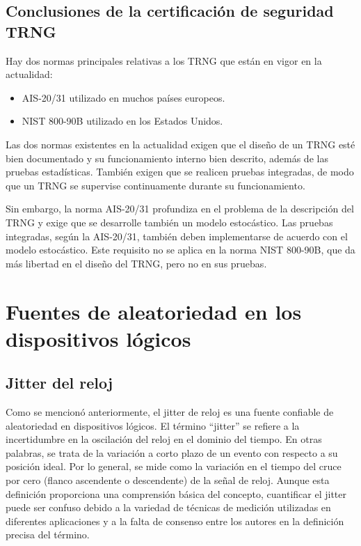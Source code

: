 		\subsection{Conclusiones de la certificación de seguridad TRNG}
		
            Hay dos normas principales relativas a los TRNG que están en vigor en la actualidad:
            
            \begin{itemize}[noitemsep]
                \item AIS-20/31 utilizado en muchos países europeos. \cite{AIS2011}
                \item NIST 800-90B utilizado en los Estados Unidos. \cite{Turan2018}
            \end{itemize}
        
            Las dos normas existentes en la actualidad exigen que el diseño de un TRNG esté bien documentado y su funcionamiento interno bien descrito, además de las pruebas estadísticas. También exigen que se realicen pruebas integradas, de modo que un TRNG se supervise continuamente durante su funcionamiento.
        
            Sin embargo, la norma AIS-20/31 profundiza en el problema de la descripción del TRNG y exige que se desarrolle también un modelo estocástico. Las pruebas integradas, según la AIS-20/31, también deben implementarse de acuerdo con el modelo estocástico. Este requisito no se aplica en la norma NIST 800-90B, que da más libertad en el diseño del TRNG, pero no en sus pruebas.

    \section{Fuentes de aleatoriedad en los dispositivos lógicos}

        \subsection{Jitter del reloj}

            Como se mencionó anteriormente, el jitter de reloj es una fuente confiable de aleatoriedad en dispositivos lógicos. El término ``jitter'' se refiere a la incertidumbre en la oscilación del reloj en el dominio del tiempo. En otras palabras, se trata de la variación a corto plazo de un evento con respecto a su posición ideal. Por lo general, se mide como la variación en el tiempo del cruce por cero (flanco ascendente o descendente) de la señal de reloj. Aunque esta definición proporciona una comprensión básica del concepto, cuantificar el jitter puede ser confuso debido a la variedad de técnicas de medición utilizadas en diferentes aplicaciones y a la falta de consenso entre los autores en la definición precisa del término.

